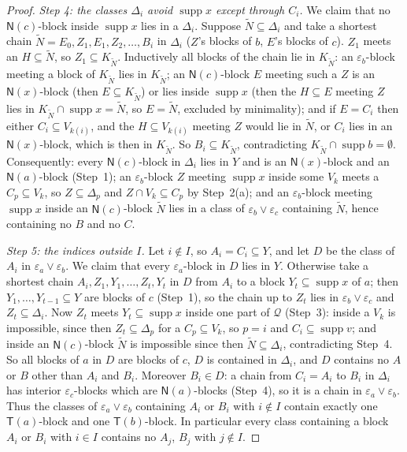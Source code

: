 \documentclass[11pt]{amsart}
\theoremstyle{definition}
\newcommand{\supp}{\operatorname{supp}}
\newcommand{\T}{\mathsf{T}}
\newcommand{\N}{\mathsf{N}}
\begin{document}
\begin{proof}
\emph{Step 4: the classes $\Delta_i$ avoid $\supp x$ except through $C_i$.} We claim that no $\N(c)$-block inside $\supp x$ lies in a $\Delta_i$. Suppose $\tilde N\subseteq\Delta_i$ and take a shortest chain $\tilde N=E_0,Z_1,E_1,Z_2,\dots,B_i$ in $\Delta_i$ ($Z$'s blocks of $b$, $E$'s blocks of $c$). $Z_1$ meets an $H\subseteq\tilde N$, so $Z_1\subseteq K_{\tilde N}$. Inductively all blocks of the chain lie in $K_{\tilde N}$: an $\varepsilon_b$-block meeting a block of $K_{\tilde N}$ lies in $K_{\tilde N}$; an $\N(c)$-block $E$ meeting such a $Z$ is an $\N(x)$-block (then $E\subseteq K_{\tilde N}$) or lies inside $\supp x$ (then the $H\subseteq E$ meeting $Z$ lies in $K_{\tilde N}\cap\supp x=\tilde N$, so $E=\tilde N$, excluded by minimality); and if $E=C_i$ then either $C_i\subseteq V_{k(i)}$, and the $H\subseteq V_{k(i)}$ meeting $Z$ would lie in $\tilde N$, or $C_i$ lies in an $\N(x)$-block, which is then in $K_{\tilde N}$. So $B_i\subseteq K_{\tilde N}$, contradicting $K_{\tilde N}\cap\supp b=\emptyset$. Consequently: every $\N(c)$-block in $\Delta_i$ lies in $Y$ and is an $\N(x)$-block and an $\N(a)$-block (Step~1); an $\varepsilon_b$-block $Z$ meeting $\supp x$ inside some $V_k$ meets a $C_p\subseteq V_k$, so $Z\subseteq\Delta_p$ and $Z\cap V_k\subseteq C_p$ by Step~2(a); and an $\varepsilon_b$-block meeting $\supp x$ inside an $\N(c)$-block $\tilde N$ lies in a class of $\varepsilon_b\vee\varepsilon_c$ containing $\tilde N$, hence containing no $B$ and no $C$.

\emph{Step 5: the indices outside $I$.} Let $i\notin I$, so $A_i=C_i\subseteq Y$, and let $D$ be the class of $A_i$ in $\varepsilon_a\vee\varepsilon_b$. We claim that every $\varepsilon_a$-block in $D$ lies in $Y$. Otherwise take a shortest chain $A_i,Z_1,Y_1,\dots,Z_t,Y_t$ in $D$ from $A_i$ to a block $Y_t\subseteq\supp x$ of $a$; then $Y_1,\dots,Y_{t-1}\subseteq Y$ are blocks of $c$ (Step~1), so the chain up to $Z_t$ lies in $\varepsilon_b\vee\varepsilon_c$ and $Z_t\subseteq\Delta_i$. Now $Z_t$ meets $Y_t\subseteq\supp x$ inside one part of $\mathcal Q$ (Step~3): inside a $V_k$ is impossible, since then $Z_t\subseteq\Delta_p$ for a $C_p\subseteq V_k$, so $p=i$ and $C_i\subseteq\supp v$; and inside an $\N(c)$-block $\tilde N$ is impossible since then $\tilde N\subseteq\Delta_i$, contradicting Step~4. So all blocks of $a$ in $D$ are blocks of $c$, $D$ is contained in $\Delta_i$, and $D$ contains no $A$ or $B$ other than $A_i$ and $B_i$. Moreover $B_i\in D$: a chain from $C_i=A_i$ to $B_i$ in $\Delta_i$ has interior $\varepsilon_c$-blocks which are $\N(a)$-blocks (Step~4), so it is a chain in $\varepsilon_a\vee\varepsilon_b$. Thus the classes of $\varepsilon_a\vee\varepsilon_b$ containing $A_i$ or $B_i$ with $i\notin I$ contain exactly one $\T(a)$-block and one $\T(b)$-block. In particular every class containing a block $A_i$ or $B_i$ with $i\in I$ contains no $A_j$, $B_j$ with $j\notin I$.


\end{proof}
\end{document}
